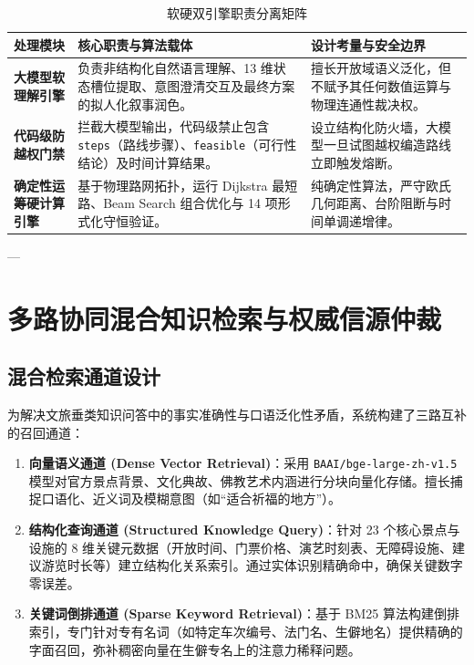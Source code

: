 \documentclass[11pt,a4paper]{ctexart}
\begin{document}
\begin{table}[htbp]
\centering
\small
\caption{软硬双引擎职责分离矩阵}
\label{tab:dual_engine}
\begin{tabularx}{\textwidth}{p{3.2cm}Xp{4.2cm}}
\toprule
\textbf{处理模块} & \textbf{核心职责与算法载体} & \textbf{设计考量与安全边界} \\
\midrule
\textbf{大模型软理解引擎} & 负责非结构化自然语言理解、13 维状态槽位提取、意图澄清交互及最终方案的拟人化叙事润色。 & 擅长开放域语义泛化，但不赋予其任何数值运算与物理连通性裁决权。 \\
\addlinespace
\textbf{代码级防越权门禁} & 拦截大模型输出，代码级禁止包含 \texttt{steps}（路线步骤）、\texttt{feasible}（可行性结论）及时间计算结果。 & 设立结构化防火墙，大模型一旦试图越权编造路线立即触发熔断。 \\
\addlinespace
\textbf{确定性运筹硬计算引擎} & 基于物理路网拓扑，运行 Dijkstra 最短路、Beam Search 组合优化与 14 项形式化守恒验证。 & 纯确定性算法，严守欧氏几何距离、台阶阻断与时间单调递增律。 \\
\bottomrule
\end{tabularx}
\end{table}

---

\section{多路协同混合知识检索与权威信源仲裁}

\subsection{混合检索通道设计}
为解决文旅垂类知识问答中的事实准确性与口语泛化性矛盾，系统构建了三路互补的召回通道：

\begin{enumerate}
    \item \textbf{向量语义通道 (Dense Vector Retrieval)}：采用 \texttt{BAAI/bge-large-zh-v1.5} 模型对官方景点背景、文化典故、佛教艺术内涵进行分块向量化存储。擅长捕捉口语化、近义词及模糊意图（如“适合祈福的地方”）。
    \item \textbf{结构化查询通道 (Structured Knowledge Query)}：针对 23 个核心景点与设施的 8 维关键元数据（开放时间、门票价格、演艺时刻表、无障碍设施、建议游览时长等）建立结构化关系索引。通过实体识别精确命中，确保关键数字零误差。
    \item \textbf{关键词倒排通道 (Sparse Keyword Retrieval)}：基于 BM25 算法构建倒排索引，专门针对专有名词（如特定车次编号、法门名、生僻地名）提供精确的字面召回，弥补稠密向量在生僻专名上的注意力稀释问题。
\end{enumerate}
\end{document}
